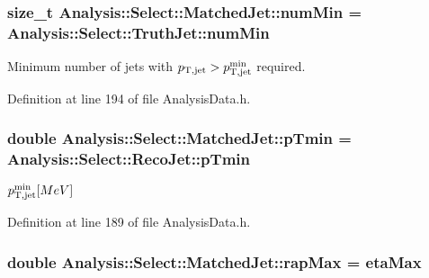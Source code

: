 \subsubsection[{\texorpdfstring{num\+Min}{numMin}}]{\setlength{\rightskip}{0pt plus 5cm}size\+\_\+t Analysis\+::\+Select\+::\+Matched\+Jet\+::num\+Min = Analysis\+::\+Select\+::\+Truth\+Jet\+::num\+Min\hspace{0.3cm}{\ttfamily [static]}}\hypertarget{namespaceAnalysis_1_1Select_1_1MatchedJet_a528450e4a45949ec4d94d15cfaef73ce}{}\label{namespaceAnalysis_1_1Select_1_1MatchedJet_a528450e4a45949ec4d94d15cfaef73ce}


Minimum number of jets with $ p_{\rm T,jet} > p_{\rm T,jet}^{\rm min} $ required. 



Definition at line 194 of file Analysis\+Data.\+h.

\subsubsection[{\texorpdfstring{p\+Tmin}{pTmin}}]{\setlength{\rightskip}{0pt plus 5cm}double Analysis\+::\+Select\+::\+Matched\+Jet\+::p\+Tmin = Analysis\+::\+Select\+::\+Reco\+Jet\+::p\+Tmin\hspace{0.3cm}{\ttfamily [static]}}\hypertarget{namespaceAnalysis_1_1Select_1_1MatchedJet_a70d769912979c438eb760d8a20cccbe0}{}\label{namespaceAnalysis_1_1Select_1_1MatchedJet_a70d769912979c438eb760d8a20cccbe0}


$ p_{\rm T,jet}^{\rm min} [MeV] $ 



Definition at line 189 of file Analysis\+Data.\+h.

\subsubsection[{\texorpdfstring{rap\+Max}{rapMax}}]{\setlength{\rightskip}{0pt plus 5cm}double Analysis\+::\+Select\+::\+Matched\+Jet\+::rap\+Max = {\bf eta\+Max}\hspace{0.3cm}{\ttfamily [static]}}\hypertarget{namespaceAnalysis_1_1Select_1_1MatchedJet_ac94f07d8da9fb774050861e765aa7f9e}{}\label{namespaceAnalysis_1_1Select_1_1MatchedJet_ac94f07d8da9fb774050861e765aa7f9e}


